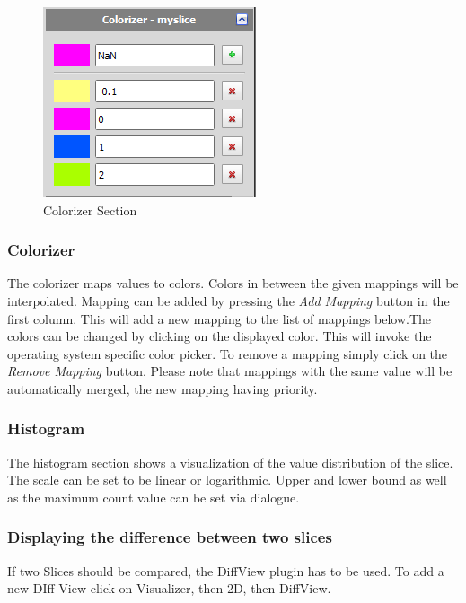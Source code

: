 \begin{figure}[h!]
	\caption{Colorizer Section}
	\centering
	\includegraphics[scale=1.0]{img/2d/colorizer.png}
\end{figure}

\subsubsection{Colorizer}

The colorizer maps values to colors. Colors in between the given mappings will be interpolated. Mapping can be added by pressing the \emph{Add Mapping} button in the first column. This will add a new mapping to the list of mappings below.\newline The colors can be changed by clicking on the displayed color. This will invoke the operating system specific color picker. \newline To remove a mapping simply click on the \emph{Remove Mapping} button. \newline Please note that mappings with the same value will be automatically merged, the new mapping having priority.

\subsubsection{Histogram}

The histogram section shows a visualization of the value distribution of the slice. The scale can be set to be linear or logarithmic. Upper and lower bound as well as the maximum count value can be set via dialogue.
 
\subsubsection{Displaying the difference between two slices}

If two Slices should be compared, the DiffView plugin has to be used. To add a new DIff View click on Visualizer, then 2D, then DiffView.

